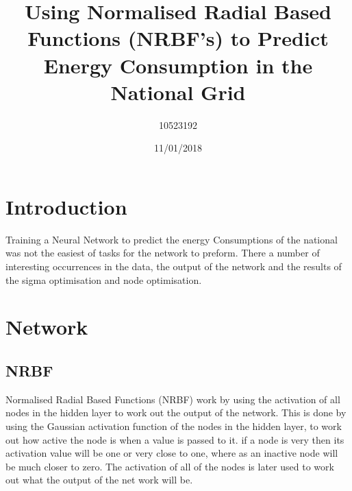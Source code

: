 \documentclass{IEEEtran}[11pt]
\title{Using Normalised Radial Based Functions (NRBF's) to Predict Energy Consumption in the National Grid}
\author{10523192}
\date{11/01/2018}
\begin{document}

\maketitle

\newpage
\section{Introduction}
\begin{flushleft}
  Training a Neural Network to predict the energy Consumptions of the national was not the easiest of tasks
  for the network to preform. There a number of interesting occurrences in the data, the output of the network and
  the results of the sigma optimisation and node optimisation.
\end{flushleft}
\section{Network}
\subsection{NRBF}
\begin{flushleft}
  Normalised Radial Based Functions (NRBF) work by using the activation of all nodes in the hidden
  layer to work out the output of the network. This is done by using the Gaussian activation function
  of the nodes in the hidden layer, to work out how active the node is when a value is passed to it.
  if a node is very then its activation value will be one or very close to one, where as an inactive
  node will be much closer to zero. The activation of all of the nodes is later used to work out what
  the output of the net work will be.
\end{flushleft}
\end{document}
